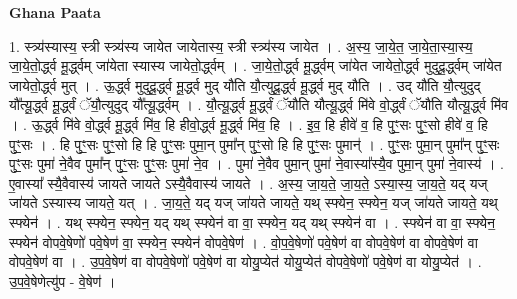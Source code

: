 \documentclass[17pt]{extarticle}
\begin{document}
\textbf{Ghana Paata } \newline

1. स्त्र्य॑स्यास्य॒ स्त्री स्त्र्य॑स्य जायेत जायेतास्य॒ स्त्री स्त्र्य॑स्य जायेत । . अ॒स्य॒ जा॒ये॒त॒ जा॒ये॒ता॒स्या॒स्य॒ जा॒ये॒तो॒र्द्ध्व मू॒र्द्ध्वम् जा॑येता स्यास्य जायेतो॒र्द्ध्वम् । . जा॒ये॒तो॒र्द्ध्व मू॒र्द्ध्वम् जा॑येत जायेतो॒र्द्ध्व मुदुदू॒र्द्ध्वम् जा॑येत जायेतो॒र्द्ध्व मुत् । . ऊ॒र्द्ध्व मुदुदू॒र्द्ध्व मू॒र्द्ध्व मुद् यौ॑ति यौ॒त्युदू॒र्द्ध्व मू॒र्द्ध्व मुद् यौ॑ति । . उद् यौ॑ति यौ॒त्युदुद् यौ᳚त्यू॒र्द्ध्व मू॒र्द्ध्वं ॅयौ॒त्युदुद् यौ᳚त्यू॒र्द्ध्वम् । . यौ॒त्यू॒र्द्ध्व मू॒र्द्ध्वं ॅयौ॑ति यौत्यू॒र्द्ध्व मि॑वे वो॒र्द्ध्वं ॅयौ॑ति यौत्यू॒र्द्ध्व मि॑व । . ऊ॒र्द्ध्व मि॑वे वो॒र्द्ध्व मू॒र्द्ध्व मि॑व॒ हि हीवो॒र्द्ध्व मू॒र्द्ध्व मि॑व॒ हि । . इ॒व॒ हि हीवे॑ व॒ हि पुꣳ॒॒सः पुꣳ॒॒सो हीवे॑ व॒ हि पुꣳ॒॒सः । . हि पुꣳ॒॒सः पुꣳ॒॒सो हि हि पुꣳ॒॒सः पुमा॒न् पुमा᳚न् पुꣳ॒॒सो हि हि पुꣳ॒॒सः पुमान्॑ । . पुꣳ॒॒सः पुमा॒न् पुमा᳚न् पुꣳ॒॒सः पुꣳ॒॒सः पुमा॑ ने॒वैव पुमा᳚न् पुꣳ॒॒सः पुꣳ॒॒सः पुमा॑ ने॒व । . पुमा॑ ने॒वैव पुमा॒न् पुमा॑ ने॒वास्या᳚स्यै॒व पुमा॒न् पुमा॑ ने॒वास्य॑ । . ए॒वास्या᳚ स्यै॒वैवास्य॑ जायते जायते ऽस्यै॒वैवास्य॑ जायते । . अ॒स्य॒ जा॒य॒ते॒ जा॒य॒ते॒ ऽस्या॒स्य॒ जा॒य॒ते॒ यद् यज् जा॑यते ऽस्यास्य जायते॒ यत् । . जा॒य॒ते॒ यद् यज् जा॑यते जायते॒ यथ् स्फ्येन॒ स्फ्येन॒ यज् जा॑यते जायते॒ यथ् स्फ्येन॑ । . यथ् स्फ्येन॒ स्फ्येन॒ यद् यथ् स्फ्येन॑ वा वा॒ स्फ्येन॒ यद् यथ् स्फ्येन॑ वा । . स्फ्येन॑ वा वा॒ स्फ्येन॒ स्फ्येन॑ वोपवे॒षेणो॑ पवे॒षेण॑ वा॒ स्फ्येन॒ स्फ्येन॑ वोपवे॒षेण॑ । . वो॒प॒वे॒षेणो॑ पवे॒षेण॑ वा वोपवे॒षेण॑ वा वोपवे॒षेण॑ वा वोपवे॒षेण॑ वा । . उ॒प॒वे॒षेण॑ वा वोपवे॒षेणो॑ पवे॒षेण॑ वा योयु॒प्येत॑ योयु॒प्येत॑ वोपवे॒षेणो॑ पवे॒षेण॑ वा योयु॒प्येत॑ । . उ॒प॒वे॒षेणेत्यु॑प - वे॒षेण॑ । \newline
\end{document}
